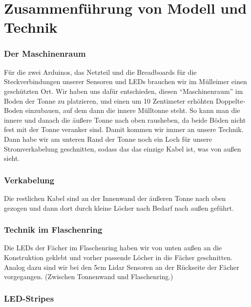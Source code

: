 \section{Zusammenführung von Modell und Technik}

    \subsubsection{Der Maschinenraum}
        
        Für die zwei Arduinos, das Netzteil und die Breadboards für die Steckverbindungen unserer Sensoren und LEDs brauchen wir im Mülleimer einen geschützten Ort. Wir haben uns dafür entschieden, diesen \enquote{Maschinenraum} im Boden der Tonne zu platzieren, und einen um 10 Zentimeter erhöhten Doppelte-Boden einzubauen, auf dem dann die innere Mülltonne steht.
        So kann man die innere und danach die äußere Tonne nach oben rausheben, da beide Böden nicht fest mit der Tonne veranker sind.
        Damit kommen wir immer an unsere Technik.
        Dann habe wir am unteren Rand der Tonne noch ein Loch für unsere Stromverkabelung geschnitten, sodass das das einzige Kabel ist, was von außen sieht.

    \subsubsection{Verkabelung}

        Die restlichen Kabel sind an der Innenwand der äußeren Tonne nach oben gezogen und dann dort durch kleine Löcher nach Bedarf nach außen geführt.


    \subsubsection{Technik im Flaschenring}

        Die LEDs der Fächer im Flaschenring haben wir von unten außen an die Konstruktion geklebt und vorher passende Löcher in die Fächer geschnitten. Analog dazu sind wir bei den 5cm Lidar Sensoren an der Rückseite der Fächer vorgegangen. (Zwischen Tonnenwand und Flaschenring.)

    \subsubsection{LED-Stripes}

